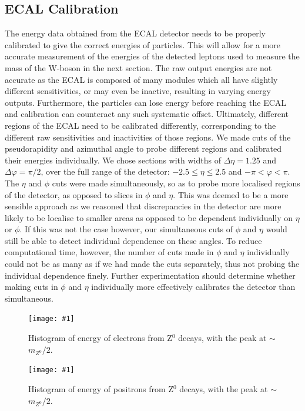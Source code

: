 \documentclass[twocolumn]{article}
\newcommand{\insertFigure}[1]{%
   \texttt{[image: \#1]}%
}
\begin{document}
\subsection{ECAL Calibration}
The energy data obtained from the ECAL detector needs to be properly calibrated to give the correct energies of particles. This will allow for a more accurate measurement of the energies of the detected leptons used to measure the mass of the W-boson in the next section. The raw output energies are not accurate as the ECAL is composed of many modules which all have slightly different sensitivities, or may even be inactive, resulting in varying energy outputs. Furthermore, the particles can lose energy before reaching the ECAL and calibration can counteract any such systematic offset. Ultimately, different regions of the ECAL need to be calibrated differently, corresponding to the different raw sensitivities and inactivities of those regions. We made cuts of the pseudorapidity and azimuthal angle to probe different regions and calibrated their energies individually. We chose sections with widths of $\Delta \eta = 1.25$ and $\Delta \varphi = \pi/2$, over the full range of the detector: $-2.5 \leq \eta \leq 2.5$ and $-\pi < \varphi < \pi$. The $\eta$ and $\phi$ cuts were made simultaneously, so as to probe more localised regions of the detector, as opposed to slices in $\phi$ and $\eta$. This was deemed to be a more sensible approach as we reasoned that discrepancies in the detector are more likely to be localise to smaller areas as opposed to be dependent individually on $\eta$ or $\phi$. If this was not the case however, our simultaneous cuts of $\phi$ and $\eta$ would still be able to detect individual dependence on these angles. To reduce computational time, however, the number of cuts made in $\phi$ and $\eta$ individually could not be as many as if we had made the cuts separately, thus not probing the individual dependence finely. Further experimentation should determine whether making cuts in $\phi$ and $\eta$ individually more effectively calibrates the detector than simultaneous. \\
\begin{figure} [!h]
	\centering
	\insertFigure{Images/ElectronEnergyLabeled.png}
	\caption{Histogram of energy of electrons from Z$^0$ decays, with the peak at $\sim$ $m_{Z^0}/2$.}
	\label{fig:Elec}
\end{figure}
\begin{figure} [!h]
	\centering
	\insertFigure{Images/PositronEnergyLabeled.png}
	\caption{Histogram of energy of positrons from Z$^0$ decays, with the peak at $\sim$ $m_{Z^0}/2$.}
	\label{fig:Pos}
\end{figure}
\end{document}
